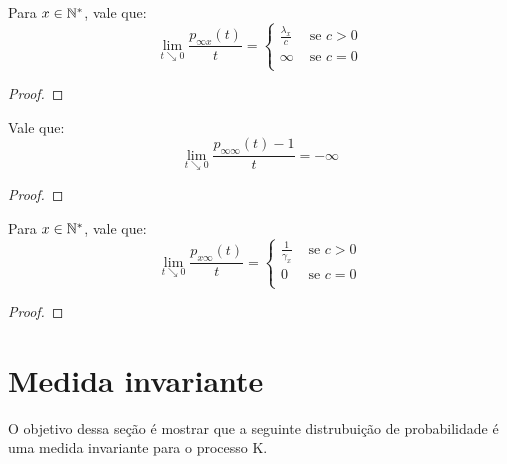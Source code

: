 \begin{proposicao}
  Para $x \in {\mathbb{N^*}}$, vale que:
  \begin{displaymath}
    \lim_{t \searrow 0} \frac{p_{\infty x}(t)}{t} = \begin{cases}
      \frac{\lambda_x}{c} & \textrm{ se } c > 0 \\
      \infty & \textrm{ se } c = 0 \\
    \end{cases}
  \end{displaymath}
\end{proposicao}
\begin{proof}

\end{proof}

\begin{proposicao}
  Vale que:
  \begin{displaymath}
    \lim_{t \searrow 0} \frac{p_{\infty \infty}(t) - 1}{t} = -\infty
  \end{displaymath}
\end{proposicao}
\begin{proof}
  
\end{proof}

\begin{proposicao}
  Para $x \in {\mathbb{N^*}}$, vale que:
  \begin{displaymath}
    \lim_{t \searrow 0} \frac{p_{x \infty}(t)}{t} = \begin{cases}
      \frac{1}{\gamma_x} & \textrm{ se } c > 0 \\
      0 & \textrm{ se } c = 0 \\
    \end{cases}
  \end{displaymath}
\end{proposicao}
\begin{proof}
  
\end{proof}


\section{Medida invariante}
\label{sec:invariante}

O objetivo dessa seção é mostrar que a seguinte distrubuição de
probabilidade é uma medida invariante para o processo K.

